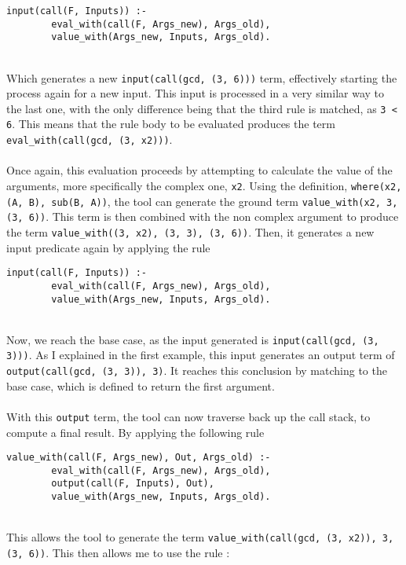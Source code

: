 \begin{lstlisting}[firstnumber=193]
input(call(F, Inputs)) :- 
		eval_with(call(F, Args_new), Args_old), 
		value_with(Args_new, Inputs, Args_old).
\end{lstlisting}
\mbox{} \\
Which generates a new \lstinline{input(call(gcd, (3, 6)))} term, effectively starting the process again for a new input. This input is processed in a very similar way to the last one, with the only difference being that the third rule is matched, as \lstinline{3 < 6}. This means that the rule body to be evaluated produces the term \lstinline{eval_with(call(gcd, (3, x2)))}. \\ \\%
Once again, this evaluation proceeds by attempting to calculate the value of the arguments, more specifically the complex one, \lstinline{x2}. Using the definition, \lstinline{where(x2, (A, B), sub(B, A))}, the tool can generate the ground term \lstinline{value_with(x2, 3, (3, 6))}. This term is then combined with the non complex argument to produce the term \lstinline{value_with((3, x2), (3, 3), (3, 6))}. Then, it generates a new input predicate again by applying the rule \\ 

\begin{lstlisting}[firstnumber=193]
input(call(F, Inputs)) :- 
		eval_with(call(F, Args_new), Args_old), 
		value_with(Args_new, Inputs, Args_old).
\end{lstlisting}
\mbox{} \\
Now, we reach the base case, as the input generated is \lstinline{input(call(gcd, (3, 3)))}. As I explained in the first example, this input generates an output term of \lstinline{output(call(gcd, (3, 3)), 3)}. It reaches this conclusion by matching to the base case, which is defined to return the first argument. \\ \\
With this \lstinline{output} term, the tool can now traverse back up the call stack, to compute a final result. By applying the following rule \\ %

\begin{lstlisting}[firstnumber=79]
value_with(call(F, Args_new), Out, Args_old) :- 
		eval_with(call(F, Args_new), Args_old), 
		output(call(F, Inputs), Out), 
		value_with(Args_new, Inputs, Args_old).
\end{lstlisting}
\mbox{} \\
This allows the tool to generate the term \lstinline{value_with(call(gcd, (3, x2)), 3, (3, 6))}. This then allows me to use the rule : \\%

